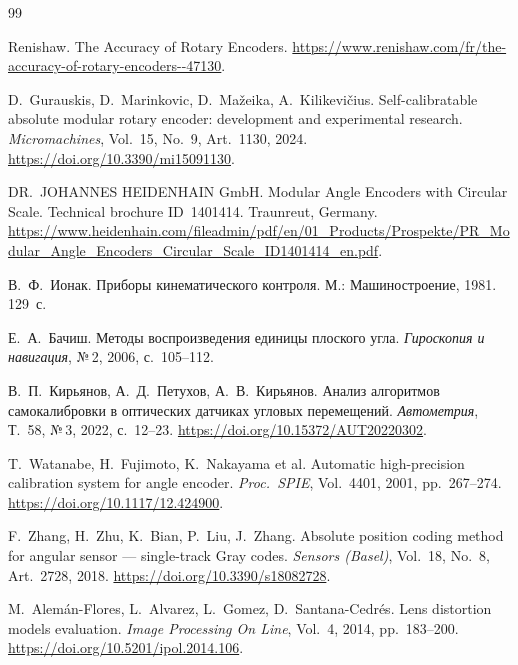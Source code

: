 \begin{thebibliography}{99}

Renishaw.
The Accuracy of Rotary Encoders.
\url{https://www.renishaw.com/fr/the-accuracy-of-rotary-encoders--47130}.

D.~Gurauskis, D.~Marinkovic, D.~Mažeika, A.~Kilikevičius.
Self-calibratable absolute modular rotary encoder:
development and experimental research.
\textit{Micromachines},
Vol.~15, No.~9, Art.~1130, 2024.
\url{https://doi.org/10.3390/mi15091130}.

DR.~JOHANNES HEIDENHAIN GmbH.
Modular Angle Encoders with Circular Scale.
Technical brochure ID~1401414.
Traunreut, Germany.
\url{https://www.heidenhain.com/fileadmin/pdf/en/01_Products/Prospekte/PR_Modular_Angle_Encoders_Circular_Scale_ID1401414_en.pdf}.

В.~Ф.~Ионак.
Приборы кинематического контроля.
М.: Машиностроение, 1981. 129~с.

Е.~А.~Бачиш.
Методы воспроизведения единицы плоского угла.
\textit{Гироскопия и навигация},
№\,2, 2006, с.~105--112.

В.~П.~Кирьянов, А.~Д.~Петухов, А.~В.~Кирьянов.
Анализ алгоритмов самокалибровки в оптических датчиках угловых перемещений.
\textit{Автометрия},
Т.~58, №\,3, 2022, с.~12--23.
\url{https://doi.org/10.15372/AUT20220302}.

T.~Watanabe, H.~Fujimoto, K.~Nakayama et al.
Automatic high-precision calibration system for angle encoder.
\textit{Proc.\ SPIE}, Vol.~4401, 2001, pp.~267--274.
\url{https://doi.org/10.1117/12.424900}.

F.~Zhang, H.~Zhu, K.~Bian, P.~Liu, J.~Zhang.
Absolute position coding method for angular sensor --- single-track Gray codes.
\textit{Sensors (Basel)}, Vol.~18, No.~8, Art.~2728, 2018.
\url{https://doi.org/10.3390/s18082728}.

M.~Alemán-Flores, L.~Alvarez, L.~Gomez, D.~Santana-Cedrés.
Lens distortion models evaluation.
\textit{Image Processing On Line}, Vol.~4, 2014, pp.~183--200.
\url{https://doi.org/10.5201/ipol.2014.106}.


\end{thebibliography}
